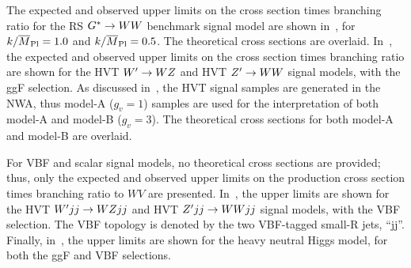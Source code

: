 The expected and observed upper limits on the cross section times branching ratio for the RS $G^*\rightarrow WW$ benchmark signal model are shown in~\Fig{\ref{fig:lim_RSGWW}}, for $k/\overline{M}_{\rm Pl}=1.0$ and $k/\overline{M}_{\rm Pl}=0.5$. The theoretical cross sections are overlaid. In~\Fig{\ref{fig:lim_HVT}}, the expected and observed upper limits on the cross section times branching ratio are shown for the HVT $W'\rightarrow WZ$ and HVT $Z'\rightarrow WW$ signal models, with the ggF selection. As discussed in~\Sect{\ref{ch:anstrat:sm}}, the HVT signal samples are generated in the NWA, thus model-A ($g_v=1$) samples are used for the interpretation of both model-A and model-B ($g_v=3$). The theoretical cross sections for both model-A and model-B are overlaid. 


For VBF and scalar signal models, no theoretical cross sections are provided; thus, only the expected and observed upper limits on the production cross section times branching ratio to $WV$ are presented. In~\Fig{\ref{fig:lim_VBF_HVT}}, the upper limits are shown for the HVT $W'jj\rightarrow WZjj$ and HVT $Z'jj\rightarrow WWjj$ signal models, with the VBF selection. The VBF topology is denoted by the two VBF-tagged small-R jets, ``jj''. Finally, in~\Fig{\ref{fig:lim_scalar}}, the upper limits are shown for the heavy neutral Higgs model, for both the ggF and VBF selections.


